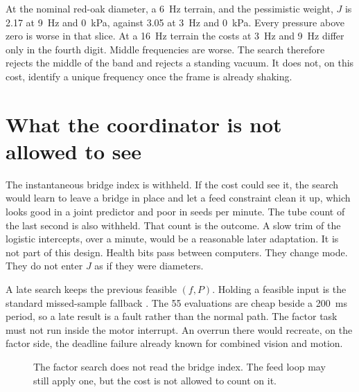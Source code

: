 \documentclass[11pt,a4paper]{article}
\begin{document}
At the nominal red-oak diameter, a 6~Hz terrain, and the pessimistic weight, $J$ is 2.17 at 9~Hz and 0~kPa, against 3.05 at 3~Hz and 0~kPa. Every pressure above zero is worse in that slice. At a 16~Hz terrain the costs at 3~Hz and 9~Hz differ only in the fourth digit. Middle frequencies are worse. The search therefore rejects the middle of the band and rejects a standing vacuum. It does not, on this cost, identify a unique frequency once the frame is already shaking.

\section{What the coordinator is not allowed to see}

The instantaneous bridge index is withheld. If the cost could see it, the search would learn to leave a bridge in place and let a feed constraint clean it up, which looks good in a joint predictor and poor in seeds per minute. The tube count of the last second is also withheld. That count is the outcome. A slow trim of the logistic intercepts, over a minute, would be a reasonable later adaptation. It is not part of this design. Health bits pass between computers. They change mode. They do not enter $J$ as if they were diameters.

A late search keeps the previous feasible $(f,P)$. Holding a feasible input is the standard missed-sample fallback \cite{rawlings2017}. The 55 evaluations are cheap beside a 200~ms period, so a late result is a fault rather than the normal path. The factor task must not run inside the motor interrupt. An overrun there would recreate, on the factor side, the deadline failure already known for combined vision and motion.

\begin{figure}[ht]
\centering
{}
\caption{The factor search does not read the bridge index. The feed loop may still apply one, but the cost is not allowed to count on it.}
\end{figure}
\end{document}
